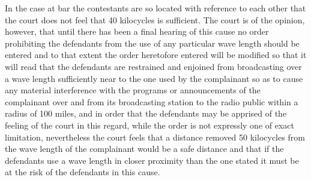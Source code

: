 In the case at bar the contestants are so located with reference to each other
that the court does not feel that 40 kilocycles is sufficient. The court is of
the opinion, however, that until there has been a final hearing of this cause
no order prohibiting the defendants from the use of any particular wave length
should be entered and to that extent the order heretofore entered will be
modified so that it will read that the defendants are restrained and enjoined
from broadcasting over a wave length sufficiently near to the one used by the
complainant so as to cause any material interference with
the programs or announcements of the complainant over and from its broadcasting
station to the radio public within a radius of 100 miles, and in order that the
defendants may be apprised of the feeling of the court in this regard, while
the order is not expressly one of exact limitation, nevertheless the court
feels that a distance removed 50 kilocycles from the wave length of the
complainant would be a safe distance and that if the defendants use a
wave length in closer proximity than the one stated it must be at the risk of
the defendants in this cause.


